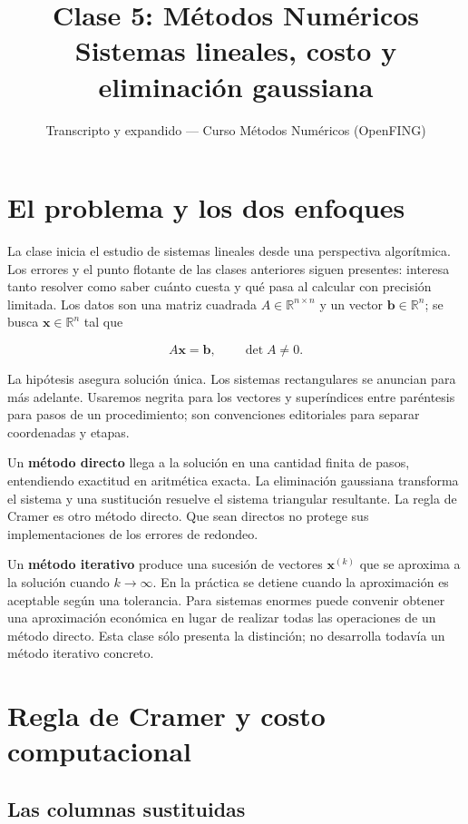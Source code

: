 \documentclass[12pt,a4paper]{article}
\title{\textbf{Clase 5: Métodos Numéricos} \\[0.3em]
        \large{Sistemas lineales, costo y eliminación gaussiana}}
\author{Transcripto y expandido --- Curso Métodos Numéricos (OpenFING)}
\date{}
\begin{document}
\maketitle
\thispagestyle{empty}
\newpage
\tableofcontents
\newpage

\section{El problema y los dos enfoques}

La clase inicia el estudio de sistemas lineales desde una perspectiva algorítmica. Los errores y el punto flotante de las clases anteriores siguen presentes: interesa tanto resolver como saber cuánto cuesta y qué pasa al calcular con precisión limitada. Los datos son una matriz cuadrada $A\in\mathbb R^{n\times n}$ y un vector $\mathbf b\in\mathbb R^n$; se busca $\mathbf x\in\mathbb R^n$ tal que

\[
A\mathbf x=\mathbf b,\qquad \det A\ne0.
\]

La hipótesis asegura solución única. Los sistemas rectangulares se anuncian para más adelante. Usaremos negrita para los vectores y superíndices entre paréntesis para pasos de un procedimiento; son convenciones editoriales para separar coordenadas y etapas.

Un \textbf{método directo} llega a la solución en una cantidad finita de pasos, entendiendo exactitud en aritmética exacta. La eliminación gaussiana transforma el sistema y una sustitución resuelve el sistema triangular resultante. La regla de Cramer es otro método directo. Que sean directos no protege sus implementaciones de los errores de redondeo.

Un \textbf{método iterativo} produce una sucesión de vectores $\mathbf x^{(k)}$ que se aproxima a la solución cuando $k\to\infty$. En la práctica se detiene cuando la aproximación es aceptable según una tolerancia. Para sistemas enormes puede convenir obtener una aproximación económica en lugar de realizar todas las operaciones de un método directo. Esta clase sólo presenta la distinción; no desarrolla todavía un método iterativo concreto.

\section{Regla de Cramer y costo computacional}

\subsection{Las columnas sustituidas}
\end{document}
